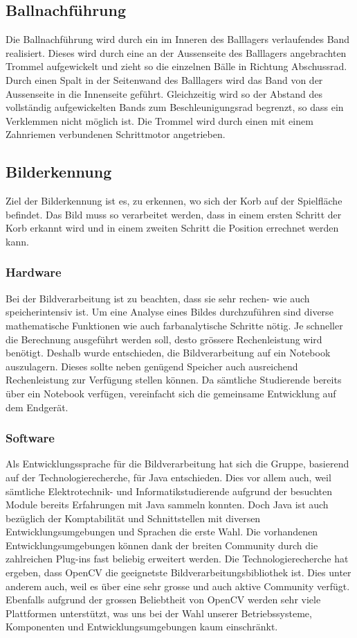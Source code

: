 \subsection{Ballnachführung}
Die Ballnachführung wird durch ein im Inneren des Balllagers verlaufendes Band 
realisiert. Dieses wird durch eine an der Aussenseite des Balllagers 
angebrachten Trommel aufgewickelt und zieht so die einzelnen Bälle in Richtung 
Abschussrad. Durch einen Spalt in der Seitenwand des Balllagers wird das Band 
von der Aussenseite in die Innenseite geführt. Gleichzeitig wird so der 
Abstand des vollständig aufgewickelten Bands zum Beschleunigungsrad begrenzt, 
so dass ein Verklemmen nicht möglich ist.
Die Trommel wird durch einen mit einem Zahnriemen verbundenen Schrittmotor angetrieben.

\subsection{Bilderkennung}
Ziel der Bilderkennung ist es, zu erkennen, wo sich der Korb auf der Spielfläche befindet. Das Bild muss so verarbeitet werden, dass in einem ersten Schritt der Korb erkannt wird und in einem zweiten Schritt die Position errechnet werden kann.
\subsubsection{Hardware}
Bei der Bildverarbeitung ist zu beachten, dass sie sehr rechen- wie auch speicherintensiv ist. Um eine Analyse eines Bildes durchzuführen sind diverse mathematische Funktionen wie auch farbanalytische Schritte nötig. Je schneller die Berechnung ausgeführt werden soll, desto grössere Rechenleistung wird benötigt. Deshalb wurde entschieden, die Bildverarbeitung auf ein Notebook auszulagern. Dieses sollte neben genügend Speicher auch ausreichend Rechenleistung zur Verfügung stellen können. Da sämtliche Studierende bereits über ein Notebook verfügen, vereinfacht sich die gemeinsame Entwicklung auf dem Endgerät.

\subsubsection{Software}
Als Entwicklungssprache für die Bildverarbeitung hat sich die Gruppe, basierend auf der Technologierecherche, für Java entschieden. Dies vor allem auch, weil sämtliche Elektrotechnik- und Informatikstudierende aufgrund der besuchten Module bereits Erfahrungen mit Java sammeln konnten. Doch Java ist auch bezüglich der Komptabilität und Schnittstellen mit diversen Entwicklungsumgebungen und Sprachen die erste Wahl. Die vorhandenen Entwicklungsumgebungen können dank der breiten Community durch die zahlreichen Plug-ins fast beliebig erweitert werden.
Die Technologierecherche hat ergeben, dass OpenCV die geeignetste Bildverarbeitungsbibliothek ist. Dies unter anderem auch, weil es über eine sehr grosse und auch aktive Community verfügt. Ebenfalls aufgrund der grossen Beliebtheit von OpenCV werden sehr viele Plattformen unterstützt, was uns bei der Wahl unserer Betriebssysteme, Komponenten und Entwicklungsumgebungen kaum einschränkt.

